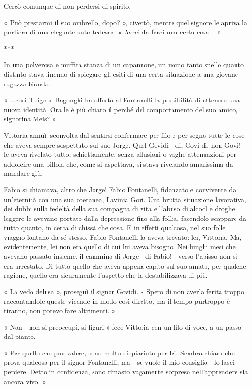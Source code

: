 Cercò comunque di non perdersi di spirito.

« Può prestarmi il suo ombrello, dopo? », civettò, mentre quel signore le apriva la portiera di una elegante auto tedesca. « Avrei da farci una certa cosa... »

***

In una polverosa e muffita stanza di un capannone, un uomo tanto snello quanto distinto stava finendo di spiegare gli esiti di una certa situazione a una giovane ragazza bionda.

« ...così il signor Bagonghi ha offerto al Fontanelli la possibilità di ottenere una nuova identità. Ora le è più chiaro il perché del comportamento del suo amico, signorina Meis? »

Vittoria annuì, sconvolta dal sentirsi confermare per filo e per segno tutte le cose che aveva sempre sospettato sul suo Jorge. Quel Govidi - di, Govi-di, non Govi! - le aveva rivelato tutto, schiettamente, senza allusioni o vaghe attenuazioni per addolcire una pillola che, come si aspettava, si stava rivelando amarissima da mandare giù.

Fabio si chiamava, altro che Jorge! Fabio Fontanelli, fidanzato e convivente da un'eternità con una sua coetanea, Lavinia Gori. Una brutta situazione lavorativa, dei dubbi sulla fedeltà della sua compagna di vita e l'abuso di alcool e droghe leggere lo avevano portato dalla depressione fino alla follia, facendolo scappare da tutto quanto, in cerca di chissà che cosa. E in effetti qualcosa, nel suo folle viaggio lontano da sé stesso, Fabio Fontanelli lo aveva trovato: lei, Vittoria. Ma, evidentemente, lei non era quello di cui lui aveva bisogno. Nei lunghi mesi che avevano passato insieme, il cammino di Jorge - di Fabio! - verso l'abisso non si era arrestato. Di tutto quello che aveva appena capito sul suo amato, per qualche ragione, quello era sicuramente l'aspetto che la destabilizzava di più.

« La vedo delusa », proseguì il signor Govidi. « Spero di non averla ferita troppo raccontandole queste vicende in modo così diretto, ma il tempo purtroppo è tiranno, non potevo fare altrimenti. »

« Non - non si preoccupi, si figuri » fece Vittoria con un filo di voce, a un passo dal pianto.

« Per quello che può valere, sono molto dispiaciuto per lei. Sembra chiaro che prova qualcosa per il signor Fontanelli, ma - se vuole il mio consiglio - lo lasci perdere. Detto in confidenza, sono rimasto vagamente sorpreso nell'apprendere sia ancora vivo. »

